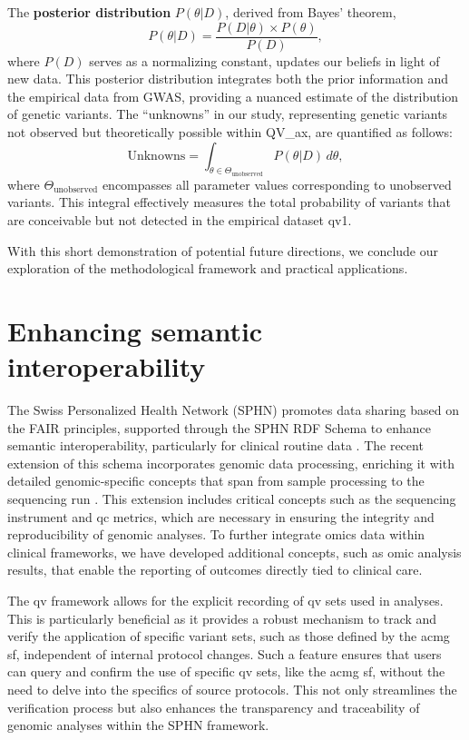 The \textbf{posterior distribution} \( P(\theta|D) \), derived from Bayes' theorem,
$$P(\theta|D) = \frac{P(D|\theta) \times P(\theta)}{P(D)},$$
where \( P(D) \) serves as a normalizing constant, updates our beliefs in light of new data. This posterior distribution integrates both the prior information and the empirical data from GWAS, providing a nuanced estimate of the distribution of genetic variants.
The ``unknowns'' in our study, representing genetic variants not observed but theoretically possible within QV\_ax, are quantified as follows:
$$
\text{Unknowns} = \int_{\theta \in \Theta_{\text{unobserved}}} P(\theta|D) \, d\theta,
$$
where \( \Theta_{\text{unobserved}} \) encompasses all parameter values corresponding to unobserved variants. 
This integral effectively measures the total probability of variants that are conceivable but not detected in the empirical dataset \ac{qv}1.

With this short demonstration of potential future directions, we conclude our exploration of the methodological framework and practical applications.

\section{Enhancing semantic interoperability}
The Swiss Personalized Health Network (SPHN) promotes data sharing based on the FAIR principles, supported through the SPHN RDF Schema to enhance semantic interoperability, particularly for clinical routine data
\cite{wilkinson2016fair}. 
The recent extension of this schema incorporates genomic data processing, enriching it with detailed genomic-specific concepts that span from sample processing to the sequencing run \cite{van2023bridging}.
This extension includes critical concepts such as the sequencing instrument and \ac{qc} metrics, which are necessary in ensuring the integrity and reproducibility of genomic analyses. To further integrate omics data within clinical frameworks, we have developed additional concepts, such as omic analysis results, that enable the reporting of outcomes directly tied to clinical care.

The \ac{qv} framework allows for the explicit recording of \ac{qv} sets used in analyses. 
This is particularly beneficial as it provides a robust mechanism to track and verify the application of specific variant sets, such as those defined by the \ac{acmg} \ac{sf}, independent of internal protocol changes. 
Such a feature ensures that users can query and confirm the use of specific \ac{qv} sets, like the \ac{acmg} \ac{sf}, without the need to delve into the specifics of source protocols. 
This not only streamlines the verification process but also enhances the transparency and traceability of genomic analyses within the SPHN framework.

